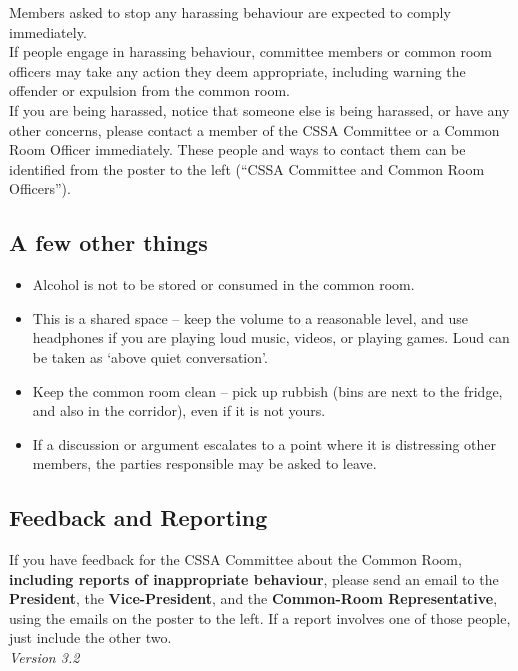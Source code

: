\documentclass[a3paper,14pt]{extarticle}
\begin{document}
Members asked to stop any harassing behaviour are expected to comply
immediately.\\[1pt]
 
If people engage in harassing behaviour, committee members or common
room officers may take any action they deem appropriate, including
warning the offender or expulsion from the common room.\\[1pt]

If you are being harassed, notice that someone else is being harassed,
or have any other concerns, please contact a member of the CSSA
Committee or a Common Room Officer immediately. These people and ways to
contact them can be identified from the poster to the left (``CSSA
Committee and Common Room Officers'').

\subsection*{A few other things}\label{a-few-other-things}

\begin{itemize}
\item
  Alcohol is not to be stored or consumed in the common room.
\item
  This is a shared space -- keep the volume to a reasonable level, and
  use headphones if you are playing loud music, videos, or playing
  games. Loud can be taken as `above quiet conversation'.
\item
  Keep the common room clean -- pick up rubbish (bins are next to the
  fridge, and also in the corridor), even if it is not yours.
\item
  If a discussion or argument escalates to a point where it is
  distressing other members, the parties responsible may be asked to
  leave.
\end{itemize}

\subsection*{Feedback and Reporting}\label{feedback-and-reporting}

If you have feedback for the CSSA Committee about the Common Room,
\textbf{including reports of inappropriate behaviour}, please send an
email to the \textbf{President}, the \textbf{Vice-President}, and the
\textbf{Common-Room Representative}, using the emails on the poster to
the left. If a report involves one of those people, just include the
other two.\\[12pt]

\emph{Version 3.2}
\end{document}
